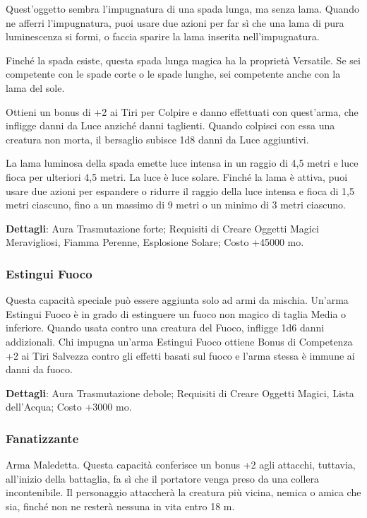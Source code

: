 \begin{multicols}{2}
Quest'oggetto sembra l'impugnatura di una spada lunga, ma senza lama. Quando ne afferri l'impugnatura, puoi usare due azioni per far sì che una lama di pura luminescenza si formi, o faccia sparire la lama inserita nell'impugnatura.

Finché la spada esiste, questa spada lunga magica ha la proprietà Versatile. Se sei competente con le spade corte o le spade lunghe, sei competente anche con la lama del sole.

Ottieni un bonus di +2 ai Tiri per Colpire e danno effettuati con quest'arma, che infligge danni da Luce anziché danni taglienti. Quando colpisci con essa una creatura non morta, il bersaglio subisce 1d8 danni da Luce aggiuntivi.

La lama luminosa della spada emette luce intensa in un raggio di 4,5 metri e luce fioca per ulteriori 4,5 metri. La luce è luce solare. Finché la lama è attiva, puoi usare due azioni per espandere o ridurre il raggio della luce intensa e fioca di 1,5 metri ciascuno, fino a un massimo di 9 metri o un minimo di 3 metri ciascuno.

\textbf{Dettagli}: Aura Trasmutazione forte; Requisiti di Creare Oggetti Magici Meravigliosi, Fiamma Perenne, Esplosione Solare; Costo +45000 mo.

\subsubsection*{Estingui Fuoco}

Questa capacità speciale può essere aggiunta solo ad armi da mischia. Un'arma Estingui Fuoco è in grado di estinguere un fuoco non magico di taglia Media o inferiore. Quando usata contro una creatura del Fuoco, infligge 1d6 danni addizionali. Chi impugna un'arma Estingui Fuoco ottiene Bonus di Competenza +2 ai Tiri Salvezza contro gli effetti basati sul fuoco e l'arma stessa è immune ai danni da fuoco.

\textbf{Dettagli}: Aura Trasmutazione debole; Requisiti di Creare Oggetti Magici, Lista dell'Acqua; Costo +3000 mo.

\subsubsection*{Fanatizzante}

Arma Maledetta. Questa capacità conferisce un bonus +2 agli attacchi, tuttavia, all’inizio della battaglia, fa sì che il portatore venga preso da una collera incontenibile. Il personaggio attaccherà la creatura più vicina, nemica o amica che sia, finché non ne resterà nessuna in vita entro 18 m.


\end{multicols}
